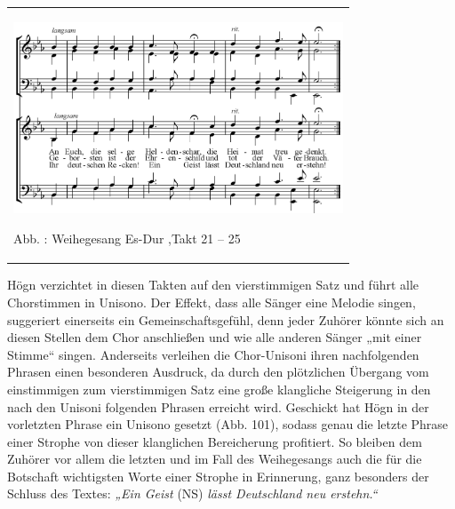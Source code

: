 \documentclass[a4paper]{article}
\newcommand\zitat[1]{\textit{#1}}
\newcounter{Abb}
\renewcommand\theAbb{\arabic{Abb}}
\begin{document}
\begin{center}
\tablefirsthead{}
\tablehead{}
\tabletail{}
\tablelasttail{}
\begin{supertabular}{m{10.009cm}}

\includegraphics[width=9.827cm,height=5.713cm]{pictures/zulassungsarbeit-img103.png}

\label{bkm:Ref100248086}Abb. \stepcounter{Abb}{\theAbb}: Weihegesang
Es-Dur ,Takt 21 – 25\\
\end{supertabular}
\end{center}
Högn verzichtet in diesen Takten auf den vierstimmigen Satz und führt
alle Chorstimmen in Unisono. Der Effekt, dass alle Sänger eine Melodie
singen, suggeriert einerseits ein Gemeinschaftsgefühl, denn jeder
Zuhörer könnte sich an diesen Stellen dem Chor anschließen und wie alle
anderen Sänger „mit einer Stimme“ singen. Anderseits verleihen die
Chor-Unisoni ihren nachfolgenden Phrasen einen besonderen Ausdruck, da
durch den plötzlichen Übergang vom einstimmigen zum vierstimmigen Satz
eine große klangliche Steigerung in den nach den Unisoni folgenden
Phrasen erreicht wird. Geschickt hat Högn in der vorletzten Phrase ein
Unisono gesetzt (Abb. 101), sodass genau die letzte Phrase einer
Strophe von dieser klanglichen Bereicherung profitiert. So bleiben dem
Zuhörer vor allem die letzten und im Fall des Weihegesangs auch die für
die Botschaft wichtigsten Worte einer Strophe in Erinnerung, ganz
besonders der Schluss des Textes: \zitat{„Ein Geist
}(NS)\zitat{ lässt Deutschland neu erstehn.“}
\end{document}
